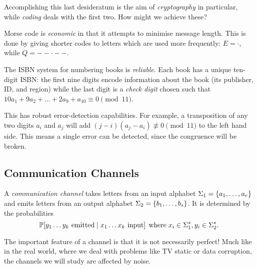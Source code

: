 \documentclass{article}
\begin{document}
Accomplishing this last desideratum is the aim of \textit{cryptography} in particular, while \textit{coding} deals with the first two. How might we achieve these?

\begin{remark}
	\label{economy-and-reliability}
    Morse code is \textit{economic} in that it attempts to minimise message length.
    This is done by giving shorter codes to letters which are used more frequently:
    $E = \cdot$, while $Q = -- \cdot --$.

	The ISBN system for numbering books is \textit{reliable}. Each book has a unique ten-digit ISBN: the first nine digits encode information about the book (its publisher, ID, and region) while the last digit is a \textit{check digit} chosen such that $10 a_1 + 9 a_2 + \dots + 2a_9 + a_{10} \equiv 0 \pmod{11}$.
	
	This has robust error-detection capabilities. For example, a transposition of any two digits $a_{i}$ and $a_{j}$ will add $(j-i)(a_{j} - a_i) \not\equiv 0 \pmod{11}$ to the left hand side. This means a single error can be detected, since the congruence will be broken.
\end{remark}


\subsection{Communication Channels}
\label{section-noiseless-communication-channels}
\vskip 8pt

\begin{definition}[Channel]
	\label{channel-definition}
    A \textit{communication channel} takes letters from an input alphabet
    $\Sigma_1 = \left\lbrace a_1, \dots, a_r \right\rbrace$
    and emits letters from an output alphabet
    $\Sigma_2 = \left\lbrace b_1, \dots, b_s \right\rbrace$.
    It is determined by the probabilities
	\[
	\mathbb{P}[y_1\dots y_k \text{ emitted} \mid x_1\dots x_k \text{ input}]
	\mathrel{\, \text{where}} x_i \in \Sigma_1^*, y_i \in \Sigma_2^*.
	\]
\end{definition}

\begin{note}
	The important feature of a channel is that it is not necessarily perfect!
	Much like in the real world,
	where we deal with problems like TV static or data corruption,
	the channels we will study are affected by noise.
\end{note}
\end{document}
